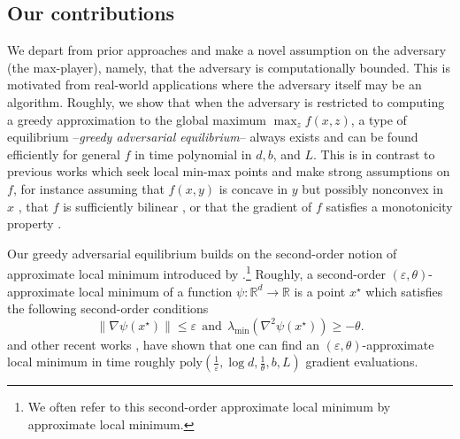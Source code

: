 \documentclass[11pt,letterpaper]{article}
\renewcommand{\epsilon}{\varepsilon}
\begin{document}
\subsection{Our contributions} 
%
We depart from prior approaches and make a novel assumption on the adversary (the max-player), namely, that the adversary is computationally bounded.  
%
This is motivated from real-world applications  where the adversary itself may be an algorithm.
%
%
 Roughly, we show that when the adversary is restricted to computing a greedy approximation to the global maximum $\max_z f(x, z)$, a type of equilibrium --{\em greedy adversarial equilibrium}-- always exists and can be found efficiently for general $f$ in time polynomial in $d, b$, and  $L$.
This is in contrast to previous works which seek local min-max points and make strong assumptions on $f$, for instance assuming that $f(x,y)$ is concave in $y$ but possibly nonconvex in $x$ \cite{thekumparampil2019efficient, rafique2018non}, that $f$ is sufficiently bilinear \cite{abernethy2019last}, or that the gradient of $f$ satisfies a monotonicity property \cite{lin2018solving, gidel2018variational}. 

Our greedy adversarial equilibrium builds on the {second-order} notion of approximate local minimum  introduced by \cite{nesterov2006cubic}.\footnote{We often refer to this second-order approximate local minimum by  approximate local minimum.} 
%
%
Roughly, a second-order $(\epsilon, \theta)$-approximate local minimum of a function $\psi: \mathbb{R}^d \rightarrow \mathbb{R}$ is a point $x^\star$ which satisfies the following second-order conditions
%
$$\|\nabla \psi(x^\star)\| \leq \epsilon \ \  \mbox{and} 
 \ \ \lambda_{\mathrm{min}}( \nabla^2 \psi(x^\star)) \geq -\theta.$$
%
%
\cite{nesterov2006cubic} and other recent works \cite{agarwal2017finding, allen2018natasha, NonconvexOptimizationForML, carmon2018accelerated, fang2018near, arjevani2020second}, have shown that one can find an $(\epsilon, \theta)$-approximate local minimum in time roughly $\mathrm{poly}\left(\frac{1}{\epsilon},\log d, \frac{1}{\theta}, b, L\right)$ gradient evaluations.
%
%
%
\end{document}
